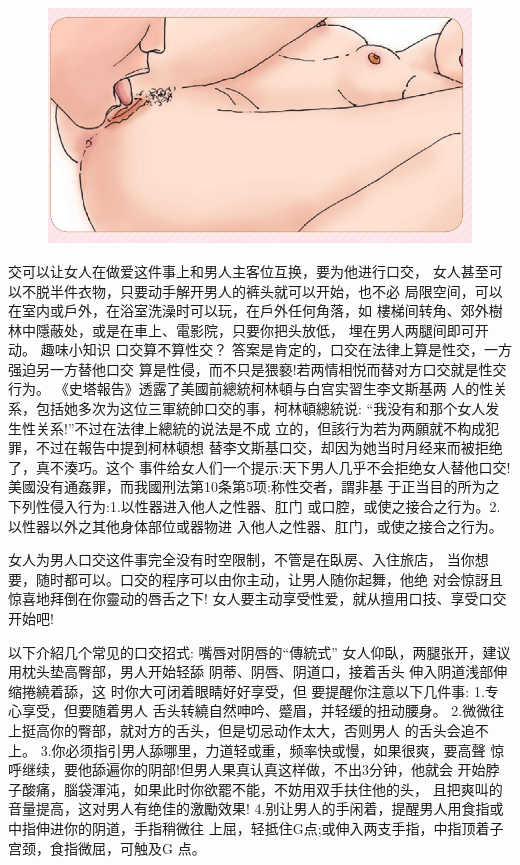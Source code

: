 \documentclass[12pt,UTF8]{ctexbook}
\begin{document}
\begin{figure}[htbp]
	\centering
	\includegraphics[width=0.7\linewidth]{19}
	\caption{}
	\label{fig:1}
\end{figure}

交可以让女人在做爱这件事上和男人主客位互换，要为他进行口交，
女人甚至可以不脱半件衣物，只要动手解开男人的裤头就可以开始，也不必
局限空间，可以在室内或戶外，在浴室洗澡时可以玩，在戶外任何角落，如
樓梯间转角、郊外樹林中隱蔽处，或是在車上、電影院，只要你把头放低，
埋在男人两腿间即可开动。
趣味小知识
口交算不算性交？
答案是肯定的，口交在法律上算是性交，一方强迫另一方替他口交
算是性侵，而不只是猥褻!若两情相悦而替对方口交就是性交行为。
《史塔報告》透露了美國前總統柯林頓与白宫实習生李文斯基两
人的性关系，包括她多次为这位三軍統帥口交的事，柯林頓總統说:
“我没有和那个女人发生性关系!”不过在法律上總統的说法是不成
立的，但該行为若为两願就不构成犯罪，不过在報告中提到柯林頓想
替李文斯基口交，却因为她当时月经来而被拒绝了，真不湊巧。这个
事件给女人们一个提示:天下男人几乎不会拒绝女人替他口交!
美國没有通姦罪，而我國刑法第10条第5项:称性交者，謂非基
于正当目的所为之下列性侵入行为:1.以性器进入他人之性器、肛门
或口腔，或使之接合之行为。2.以性器以外之其他身体部位或器物进
入他人之性器、肛门，或使之接合之行为。

女人为男人口交这件事完全没有时空限制，不管是在臥房、入住旅店，
当你想要，随时都可以。口交的程序可以由你主动，让男人随你起舞，他绝
对会惊訝且惊喜地拜倒在你靈动的唇舌之下!
女人要主动享受性爱，就从擅用口技、享受口交开始吧!

以下介紹几个常见的口交招式:
嘴唇对阴唇的“傳統式”
女人仰臥，两腿张开，建议
用枕头垫高臀部，男人开始轻舔
阴蒂、阴唇、阴道口，接着舌头
伸入阴道浅部伸缩捲繞着舔，这
时你大可闭着眼睛好好享受，但
要提醒你注意以下几件事:
1.专心享受，但要随着男人
舌头转繞自然呻吟、蹙眉，并轻缓的扭动腰身。
2.微微往上挺高你的臀部，就对方的舌头，但是切忌动作太大，否则男人
的舌头会追不上。
3.你必须指引男人舔哪里，力道轻或重，频率快或慢，如果很爽，要高聲
惊呼继续，要他舔遍你的阴部!但男人果真认真这样做，不出3分钟，他就会
开始脖子酸痛，腦袋渾沌，如果此时你欲罷不能，不妨用双手扶住他的头，
且把爽叫的音量提高，这对男人有绝佳的激勵效果!
4.别让男人的手闲着，提醒男人用食指或中指伸进你的阴道，手指稍微往
上屈，轻抵住G点;或伸入两支手指，中指顶着子宫颈，食指微屈，可触及G
点。
\end{document}
